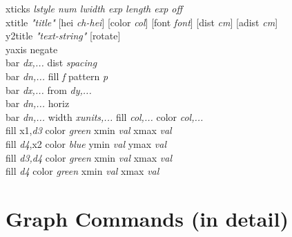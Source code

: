 {\sf xticks {\it {\sf lstyle} num {\sf lwidth} exp {\sf length} exp {\sf off}}} \\
{\sf xtitle {\it "title"} [hei {\it ch-hei}] [color {\it col}] [font {\it font}] [dist {\it cm}] [adist {\it cm}]}   \\
{\sf y2title {\it "text-string"}  [rotate]  }  \\
{\sf yaxis negate}  \\
{\sf bar {\it dx,...} dist {\it spacing}}\\
{\sf bar {\it dn,...} fill {\it f} pattern {\it p}} \\
{\sf bar {\it dx,...} from {\it dy,...}}\\
{\sf bar {\it dn,...} horiz} \\
{\sf bar {\it dn,...} width {\it xunits,...} fill {\it col,...} color {\it col,...} }\\
{\sf fill x1,{\it d3} color {\it green}  xmin {\it val} xmax {\it val}} \\
{\sf fill {\it d4},x2 color {\it blue}   ymin {\it val} ymax {\it val}} \\
{\sf fill {\it d3,d4} color {\it green}  xmin {\it val} xmax {\it val}} \\
{\sf fill {\it d4} color {\it green}  xmin {\it val} xmax {\it val}} \\


\section{Graph Commands (in detail)}

